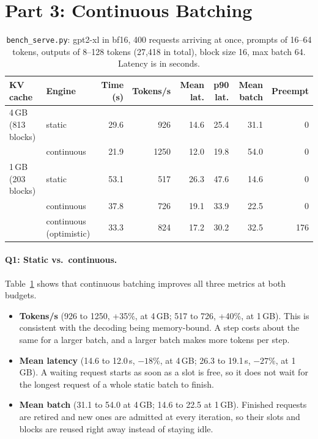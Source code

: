 \documentclass[10pt]{article}
\begin{document}
\section*{Part 3: Continuous Batching}

\begin{table}[htbp]
\caption{\texttt{bench\_serve.py}: gpt2-xl in bf16, 400 requests arriving
at once, prompts of 16--64 tokens, outputs of 8--128 tokens (27{,}418 in
total), block size 16, max batch 64. Latency is in seconds.}
\label{tab:serve}
\centering
\small
\begin{tabular}{llrrrrrr}
\toprule
KV cache & Engine & Time (s) & Tokens/s & Mean lat. & p90 lat. & Mean batch & Preempt \\
\midrule
4\,GB (813 blocks) & static     & 29.6 &  926 & 14.6 & 25.4 & 31.1 & 0 \\
                   & continuous & 21.9 & 1250 & 12.0 & 19.8 & 54.0 & 0 \\
\midrule
1\,GB (203 blocks) & static     & 53.1 &  517 & 26.3 & 47.6 & 14.6 & 0 \\
                   & continuous & 37.8 &  726 & 19.1 & 33.9 & 22.5 & 0 \\
                   & continuous (optimistic) & 33.3 & 824 & 17.2 & 30.2 & 32.5 & 176 \\
\bottomrule
\end{tabular}
\end{table}

\paragraph{Q1: Static vs.\ continuous.}
Table~\ref{tab:serve} shows that continuous batching improves all three
metrics at both budgets.
\begin{itemize}
\item \textbf{Tokens/s} (926 to 1250, +35\%, at 4\,GB; 517 to 726, +40\%,
  at 1\,GB). This is consistent with the decoding being memory-bound.
  A step costs about the same for
  a larger batch, and a larger batch makes more tokens per step.
\item \textbf{Mean latency} (14.6 to 12.0\,s, $-18$\%, at 4\,GB; 26.3 to
  19.1\,s, $-27$\%, at 1\,GB). A waiting request starts as soon as a slot
  is free, so it does not wait for the longest request of a whole static
  batch to finish.
\item \textbf{Mean batch} (31.1 to 54.0 at 4\,GB; 14.6 to 22.5 at 1\,GB).
  Finished requests are retired and new ones are admitted at every
  iteration, so their slots and blocks are reused right away instead of
  staying idle.
\end{itemize}
\end{document}
